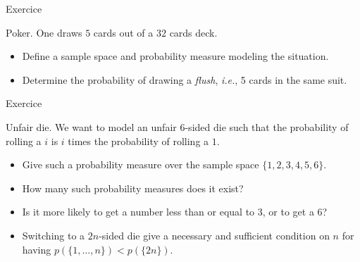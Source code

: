 \documentclass{beamer}
\begin{document}
\begin{frame}{Exercice}
  \begin{exampleblock}{Poker.}
    One draws $5$ cards out of a $32$ cards deck.
    \begin{itemize}
    \item Define a sample space and probability measure modeling the situation.
    \item Determine the probability of drawing a \emph{flush}, \emph{i.e.}, 5 cards in the same suit.
    \end{itemize}
    
  \end{exampleblock}
\end{frame}
  
\begin{frame}{Exercice}
  \begin{exampleblock}{Unfair die.}
    We want to model an unfair $6$-sided die such that the probability of rolling a $i$ is $i$ times the probability of rolling a $1$.
    \begin{itemize}
    \item Give such a probability measure over the sample space $\{ 1,2,3,4,5,6 \}$.
    \item How many such probability measures does it exist?
    \item Is it more likely to get a number less than or equal to $3$, or to get a $6$?
    \item Switching to a $2n$-sided die give a necessary and sufficient condition on $n$ for having $p(\{1, \dots, n\}) < p(\{2n\})$.
    \end{itemize}
  \end{exampleblock}
  
\end{frame}
\end{document}
